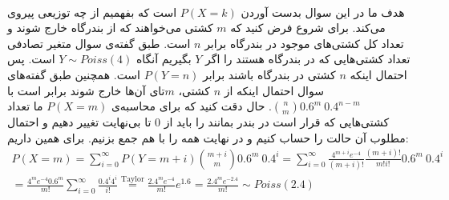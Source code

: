 \\
هدف ما در این سوال بدست آوردن
$P(X = k)$
است که بفهمیم از چه توزیعی پیروی می‌کند.
برای شروع فرض کنید که
$m$
کشتی می‌خواهند که از بندرگاه خارج شوند و تعداد کل کشتی‌های موجود در بندرگاه برابر
$n$
است. طبق گفته‌ی سوال متغیر تصادفی تعداد کشتی‌هایی که در بندرگاه هستند را اگر
$Y$
بگیریم آنگاه
$Y \sim Poiss(4)$
است. پس احتمال اینکه
$n$
کشتی در بندرگاه باشند برابر
$P(Y = n)$
است. همچنین طبق گفته‌های سوال احتمال اینکه از
$n$
کشتی،
$m$تای
آن‌ها خارج شوند برابر است با
${n \choose m} 0.6^m ~ 0.4^{n-m}$.
حال دقت کنید که برای محاسبه‌ی
$P(X = m)$
ما تعداد کشتی‌هایی که قرار است در بندر بمانند را باید از 0 تا بی‌نهایت تغییر دهیم و احتمال مطلوب آن حالت را
حساب کنیم و در نهایت همه را با هم جمع بزنیم. برای همین داریم:
\begin{gather*}
    P(X = m) = \sum_{i=0}^{\infty} P(Y=m+i) {m + i \choose m} 0.6^m ~ 0.4^i
    = \sum_{i=0}^{\infty} \frac{4^{m+i} e^{-4}}{(m+i)!} \frac{(m+i)!}{m! i!} 0.6^m ~ 0.4^i\\
    = \frac{4^m e^{-4} 0.6^m}{m!} \sum_{i=0}^{\infty} \frac{0.4^i 4^i}{i!}
    \stackrel{\text{Taylor}}{=} \frac{2.4^m e^{-4}}{m!} e^{1.6} = \frac{2.4^m e^{-2.4}}{m!} \sim Poiss(2.4)
\end{gather*}